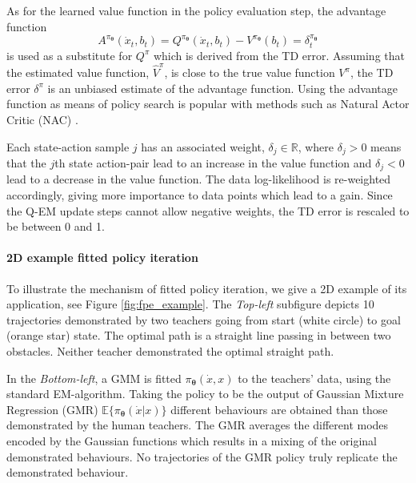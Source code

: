 \documentclass[final,5p,times,twocolumn]{elsarticle}
\newcommand{\X}{x}
\newcommand{\B}{b}
\newcommand{\U}{\dot{x}}
\newcommand{\Param}{\boldsymbol{\theta}}
\begin{document}
As for the learned value function in the policy evaluation step, the advantage function
\begin{equation}\label{eq:advantage_f}
 A^{\pi_{\Param}}(\U_t,\B_t) =  Q^{\pi_{\Param}}(\U_t,\B_t) - V^{\pi_{\Param}}(\B_t) = \delta^{\pi_{\Param}}_t
\end{equation}
is used as a substitute for $Q^{\pi}$ which is derived from the TD error. Assuming that the estimated 
value function, $\hat{V}^{\pi}$, is close to the true value function $V^{\pi}$, the 
TD error $\delta^{\pi}$ is an unbiased estimate of the advantage function. Using the 
advantage function as means of policy search is popular with methods such as Natural Actor Critic (NAC) \cite{peter_nac_2008}.

Each state-action sample $j$ has an associated weight, $\delta_j \in \mathbb{R}$, where $\delta_j > 0$ means that the 
$j$th state action-pair lead to an increase in the value function and $\delta_j < 0$ lead to 
a decrease in the value function. The data log-likelihood is re-weighted accordingly, giving more importance to data points which lead to a gain. Since 
the Q-EM update steps cannot allow negative weights, the TD error is rescaled to be between 0 and 1. 




\paragraph{2D example fitted policy iteration}

To illustrate the mechanism of fitted policy iteration, we give a 2D example 
of its application, see Figure \ref{fig:fpe_example}. The \textit{Top-left} subfigure
depicts 10 trajectories demonstrated by two teachers going from start (white circle) to goal (orange star) state. 
The optimal path is a straight line passing in between two obstacles. 
Neither teacher demonstrated the optimal straight path. 

In the \textit{Bottom-left}, a GMM is fitted $\pi_{\Param}(\U,\X)$ to the teachers' data, using the standard EM-algorithm.
Taking the policy to be the output of Gaussian Mixture Regression (GMR) $\mathbb{E}\{\pi_{\Param}(\U|\X)\}$ different
behaviours are obtained than those demonstrated by the human teachers. The GMR averages the different modes encoded by the Gaussian functions 
which results in a mixing of the original demonstrated behaviours. No trajectories of the GMR policy truly replicate 
the demonstrated behaviour. 
\end{document}
